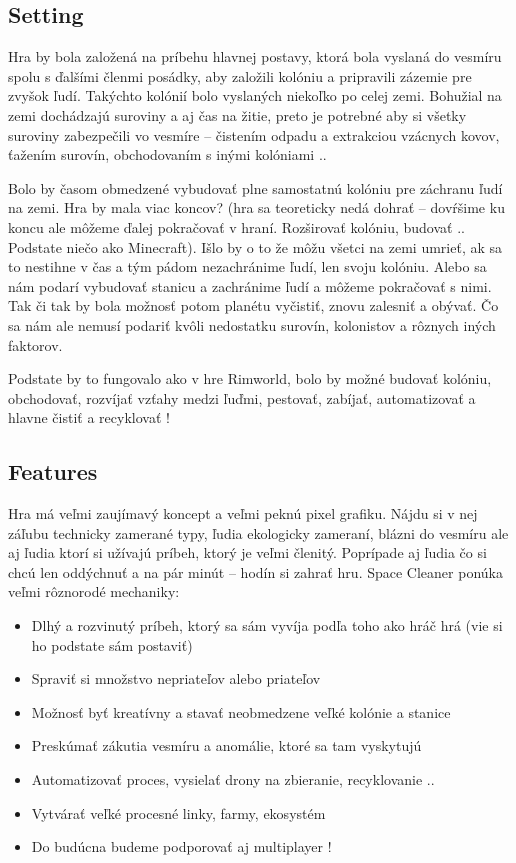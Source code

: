 \documentclass[a4paper,10pt,slovak]{article}
\begin{document}
\subsection*{Setting}
Hra by bola založená na príbehu hlavnej postavy, ktorá bola vyslaná do vesmíru spolu s ďalšími členmi posádky, aby založili kolóniu a pripravili zázemie pre zvyšok ľudí. Takýchto kolónií bolo vyslaných niekoľko po celej zemi. Bohužial na zemi dochádzajú suroviny a aj čas na žitie, preto je potrebné aby si všetky suroviny zabezpečili vo vesmíre – čistením odpadu a extrakciou vzácnych kovov, ťažením surovín, obchodovaním s inými kolóniami ..

Bolo by časom obmedzené vybudovať plne samostatnú kolóniu pre záchranu ľudí na zemi. Hra by mala viac koncov? (hra sa teoreticky nedá dohrať – dovŕšime ku koncu ale môžeme ďalej pokračovať v hraní. Rozširovať kolóniu, budovať .. Podstate niečo ako Minecraft). Išlo by o to že môžu všetci na zemi umrieť, ak sa to nestihne v čas a tým pádom nezachránime ľudí, len svoju kolóniu. Alebo sa nám podarí vybudovať stanicu a zachránime ľudí a môžeme pokračovať s nimi. Tak či tak by bola možnosť potom planétu vyčistiť, znovu zalesniť a obývať. Čo sa nám ale nemusí podariť kvôli nedostatku surovín, kolonistov a rôznych iných faktorov.

Podstate by to fungovalo ako v hre Rimworld, bolo by možné budovať kolóniu, obchodovať, rozvíjať vzťahy medzi ľuďmi, pestovať, zabíjať, automatizovať a hlavne čistiť a recyklovať !

\newpage

\subsection*{Features}
Hra má veľmi zaujímavý koncept a veľmi peknú pixel grafiku. Nájdu si v nej záľubu technicky zamerané typy, ľudia ekologicky zameraní, blázni do vesmíru ale aj ľudia ktorí si užívajú príbeh, ktorý je veľmi členitý. Poprípade aj ľudia čo si chcú len oddýchnuť a na pár minút – hodín si zahrať hru.
\newline\newlineS
Space Cleaner ponúka veľmi rôznorodé mechaniky:
\begin{itemize}
    \item Dlhý a rozvinutý príbeh, ktorý sa sám vyvíja podľa toho ako hráč hrá (vie si ho podstate sám postaviť)
    \item Spraviť si množstvo nepriateľov alebo priateľov
    \item Možnosť byť kreatívny a stavať neobmedzene veľké kolónie a stanice
    \item Preskúmať zákutia vesmíru a anomálie, ktoré sa tam vyskytujú
    \item Automatizovať proces, vysielať drony na zbieranie, recyklovanie ..
    \item Vytvárať veľké procesné linky, farmy, ekosystém
    \item Do budúcna budeme podporovať aj multiplayer !
\end{itemize}
\end{document}
